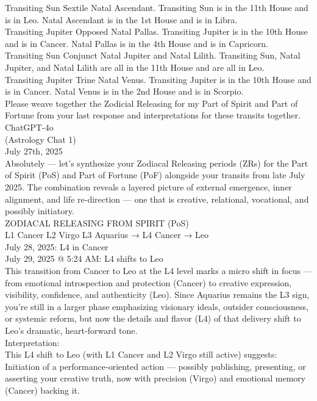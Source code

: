 \documentclass{article}
\begin{document}
Transiting Sun Sextile Natal Ascendant. Transiting Sun is in the 11th House and is in Leo. Natal Ascendant is in the 1st House and is in Libra.\\
Transiting Jupiter Opposed Natal Pallas. Transiting Jupiter is in the 10th House and is in Cancer. Natal Pallas is in the 4th House and is in Capricorn.\\
Transiting Sun Conjunct Natal Jupiter and Natal Lilith. Transiting Sun, Natal Jupiter, and Natal Lilith are all in the 11th House and are all in Leo.\\
Transiting Jupiter Trine Natal Venus. Transiting Jupiter is in the 10th House and is in Cancer. Natal Venus is in the 2nd House and is in Scorpio.\\
Please weave together the Zodicial Releasing for my Part of Spirit and Part of Fortune from your last response and interpretations for these transits together.\\
ChatGPT-4o\\
(Astrology Chat 1)\\
July 27th, 2025\\
Absolutely --- let's synthesize your Zodiacal Releasing periods (ZRs) for the Part of Spirit (PoS) and Part of Fortune (PoF) alongside your transits from late July 2025. The combination reveals a layered picture of external emergence, inner alignment, and life re-direction --- one that is creative, relational, vocational, and possibly initiatory.\\
ZODIACAL RELEASING FROM SPIRIT (PoS)\\
L1 Cancer L2 Virgo L3 Aquarius → L4 Cancer → Leo\\
July 28, 2025: L4 in Cancer\\
July 29, 2025 @ 5:24 AM: L4 shifts to Leo\\
This transition from Cancer to Leo at the L4 level marks a micro shift in focus --- from emotional introspection and protection (Cancer) to creative expression, visibility, confidence, and authenticity (Leo). Since Aquarius remains the L3 sign, you're still in a larger phase emphasizing visionary ideals, outsider consciousness, or systemic reform, but now the details and flavor (L4) of that delivery shift to Leo's dramatic, heart-forward tone.\\
Interpretation:\\
This L4 shift to Leo (with L1 Cancer and L2 Virgo still active) suggests:\\
Initiation of a performance-oriented action --- possibly publishing, presenting, or asserting your creative truth, now with precision (Virgo) and emotional memory (Cancer) backing it.\\
\end{document}
